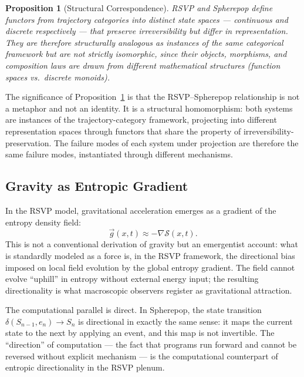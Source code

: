 \documentclass[12pt, twoside]{article}
\theoremstyle{plain}
\newtheorem{proposition}[theorem]{Proposition}
\theoremstyle{definition}
\theoremstyle{remark}
\begin{document}
\begin{proposition}[Structural Correspondence]
\label{prop:correspondence}
RSVP and Spherepop define functors from trajectory categories
into distinct state spaces — continuous and discrete respectively —
that preserve irreversibility but differ in representation.
They are therefore \emph{structurally analogous} as instances of
the same categorical framework but are not strictly isomorphic,
since their objects, morphisms, and composition laws are
drawn from different mathematical structures
(function spaces vs.\ discrete monoids).
\end{proposition}

The significance of Proposition~\ref{prop:correspondence}
is that the RSVP–Spherepop relationship is not a metaphor
and not an identity.
It is a structural homomorphism: both systems are instances of
the trajectory-category framework, projecting into different
representation spaces through functors that share the property
of irreversibility-preservation.
The failure modes of each system under projection are therefore
the same failure modes, instantiated through different mechanisms.

\subsection{Gravity as Entropic Gradient}

In the RSVP model, gravitational acceleration emerges as a gradient
of the entropy density field:
\[
  \vec{g}(x,t) \approx -\nabla \mathcal{S}(x,t).
\]
This is not a conventional derivation of gravity but an
emergentist account: what is standardly modeled as a force
is, in the RSVP framework, the directional bias imposed on
local field evolution by the global entropy gradient.
The field cannot evolve ``uphill'' in entropy without external
energy input; the resulting directionality is what
macroscopic observers register as gravitational attraction.

The computational parallel is direct.
In Spherepop, the state transition $\delta(S_{n-1}, e_n) \to S_n$
is directional in exactly the same sense:
it maps the current state to the next by applying an event,
and this map is not invertible.
The ``direction'' of computation — the fact that programs
run forward and cannot be reversed without explicit mechanism
— is the computational counterpart of entropic directionality
in the RSVP plenum.
\end{document}

